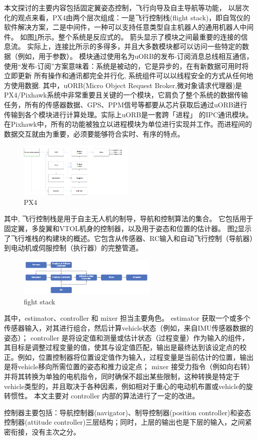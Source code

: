 本文探讨的主要内容包括固定翼姿态控制，飞行向导及自主导航等功能，
以层次化的观点来看，PX4由两个层次组成：一是飞行控制栈(flight stack)，即自驾仪的软件解决方案，二是中间件，一种可以支持任意类型自主机器人的通用机器人中间件。
如图\ref{px4}所示。整个系统是反应式的。
箭头显示了模块之间最重要的连接的信息流。 实际上，连接比所示的多得多，并且大多数模块都可以访问一些特定的数据（例如，用于参数）。
模块通过使用名为uORB的发布-订阅消息总线相互通信，
使用“发布-订阅”方案意味着：系统是被动的，它是异步的，在有新数据可用时将立即更新
所有操作和通讯都完全并行化, 系统组件可以以线程安全的方式从任何地方使用数据.
其中，uORB(Micro Object Request Broker,微对象请求代理器)是PX4/Pixhawk系统中非常重要且关键的一个模块，它肩负了整个系统的数据传输任务，所有的传感器数据、GPS、PPM信号等都要从芯片获取后通过uORB进行传输到各个模块进行计算处理。实际上uORB是一套跨「进程」 的IPC通讯模块。在Pixhawk中，所有的功能被独立以进程模块为单位进行实现并工作。而进程间的数据交互就由为重要，必须要能够符合实时、有序的特点。

\begin{figure}
    \centering
    \includegraphics[width=0.5\textwidth]{pictures/PX4_Architecture_1.png}
    \caption{PX4}
    \label{px4}
\end{figure}
   
    其中, 飞行控制栈是用于自主无人机的制导，导航和控制算法的集合。 
    它包括用于固定翼，多旋翼和VTOL机身的控制器，以及用于姿态和位置的估计器。
图\ref{fight}显示了飞行堆栈的构建块的概述。它包含从传感器、RC输入和自动飞行控制（导航器）到电动机或伺服控制（执行器）的完整管道。
\begin{figure}[H]
    \centering
    \includegraphics[width=0.6\textwidth]{pictures/fight_stack.png}
    \caption{fight stack}
    \label{fight}
\end{figure}
其中，estimator、controller 和 mixer 担当主要角色。
estimator 获取一个或多个传感器输入，对其进行组合，然后计算vehicle状态（例如，来自IMU传感器数据的姿态）；
controller 是将设定值和测量或估计状态（过程变量）作为输入的组件，其目标是调整过程变量的值，使其与设定值匹配，输出是最终达到该设定点的校正。例如，位置控制器将位置设定值作为输入，过程变量是当前估计的位置，输出是将vehicle移向所需位置的姿态和推力设定点；
mixer 接受力指令（例如向右转）并将其转换为单独的电机指令，同时确保不超出某些限制，这种转换是特定于vehicle类型的，并且取决于各种因素，例如相对于重心的电动机布置或vehicle的旋转惯性。
本文主要对 controller 内部的算法进行了一定的改进。\par
控制器主要包括：导航控制器(navigator)、制导控制器(position controller)和姿态控制器(attitude controller)三层结构；同时，上层的输出也是下层的输入，之间紧密衔接，没有主次之分。